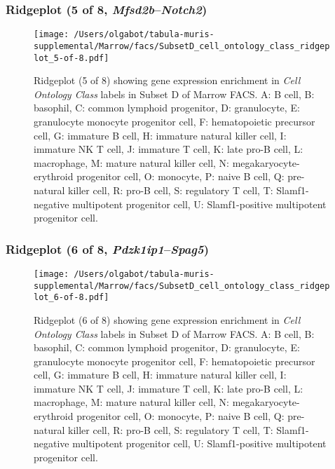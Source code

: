 \subsubsection{Ridgeplot (5 of 8, \emph{Mfsd2b}--\emph{Notch2})}
\begin{figure}[h]
\centering
\texttt{[image: /Users/olgabot/tabula-muris-supplemental/Marrow/facs/SubsetD\_cell\_ontology\_class\_ridgeplot\_5-of-8.pdf]}

\caption{ Ridgeplot (5 of 8)  showing gene expression enrichment in \emph{Cell Ontology Class} labels in Subset D of Marrow FACS. A: B cell, B: basophil, C: common lymphoid progenitor, D: granulocyte, E: granulocyte monocyte progenitor cell, F: hematopoietic precursor cell, G: immature B cell, H: immature natural killer cell, I: immature NK T cell, J: immature T cell, K: late pro-B cell, L: macrophage, M: mature natural killer cell, N: megakaryocyte-erythroid progenitor cell, O: monocyte, P: naive B cell, Q: pre-natural killer cell, R: pro-B cell, S: regulatory T cell, T: Slamf1-negative multipotent progenitor cell, U: Slamf1-positive multipotent progenitor cell.}
\end{figure}


\clearpage

\subsubsection{Ridgeplot (6 of 8, \emph{Pdzk1ip1}--\emph{Spag5})}
\begin{figure}[h]
\centering
\texttt{[image: /Users/olgabot/tabula-muris-supplemental/Marrow/facs/SubsetD\_cell\_ontology\_class\_ridgeplot\_6-of-8.pdf]}

\caption{ Ridgeplot (6 of 8)  showing gene expression enrichment in \emph{Cell Ontology Class} labels in Subset D of Marrow FACS. A: B cell, B: basophil, C: common lymphoid progenitor, D: granulocyte, E: granulocyte monocyte progenitor cell, F: hematopoietic precursor cell, G: immature B cell, H: immature natural killer cell, I: immature NK T cell, J: immature T cell, K: late pro-B cell, L: macrophage, M: mature natural killer cell, N: megakaryocyte-erythroid progenitor cell, O: monocyte, P: naive B cell, Q: pre-natural killer cell, R: pro-B cell, S: regulatory T cell, T: Slamf1-negative multipotent progenitor cell, U: Slamf1-positive multipotent progenitor cell.}
\end{figure}


\clearpage

